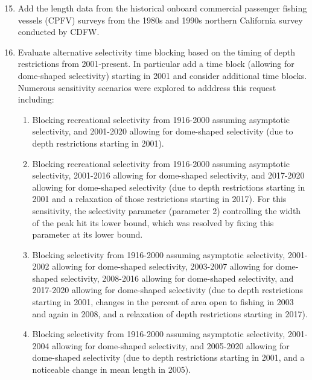 \documentclass[11pt,
  english,
  letterpaper,
]{article}
\begin{document}
\leavevmode\tagmcend\tagstructend\par

\begin{enumerate}
\setcounter{enumi}{14}
   
  \item Add the length data from the historical onboard commercial passenger fishing vessels (CPFV) surveys from the 1980s and 1990s northern California survey conducted by CDFW.

  \item Evaluate alternative selectivity time blocking based on the timing of depth restrictions from 2001-present. In particular add a time block (allowing for dome-shaped selectivity) starting in 2001 and consider additional time blocks. Numerous sensitivity scenarios were explored to adddress this request including:
  
  \begin{enumerate}
  
  \item Blocking recreational selectivity from 1916-2000 assuming asymptotic selectivity, and 2001-2020 allowing for dome-shaped selectivity (due to depth restrictions starting in 2001).
  
  \item Blocking recreational selectivity from 1916-2000 assuming asymptotic selectivity, 2001-2016 allowing for dome-shaped selectivity, and 2017-2020 allowing for dome-shaped selectivity (due to depth restrictions starting in 2001 and a relaxation of those restrictions starting in 2017). For this sensitivity, the selectivity parameter (parameter 2) controlling the width of the peak hit its lower bound, which was resolved by fixing this parameter at its lower bound.
  
  \item Blocking selectivity from 1916-2000 assuming asymptotic selectivity, 2001-2002 allowing for dome-shaped selectivity, 2003-2007 allowing for dome-shaped selectivity, 2008-2016 allowing for dome-shaped selectivity, and 2017-2020 allowing for dome-shaped selectivity (due to depth restrictions starting in 2001, changes in the percent of area open to fishing in 2003 and again in 2008, and a relaxation of depth restrictions starting in 2017).
  
  \item Blocking selectivity from 1916-2000 assuming asymptotic selectivity, 2001-2004 allowing for dome-shaped selectivity, and 2005-2020 allowing for dome-shaped selectivity (due to depth restrictions starting in 2001, and a noticeable change in mean length in 2005).
  

\end{enumerate}
\end{enumerate}
\end{document}
